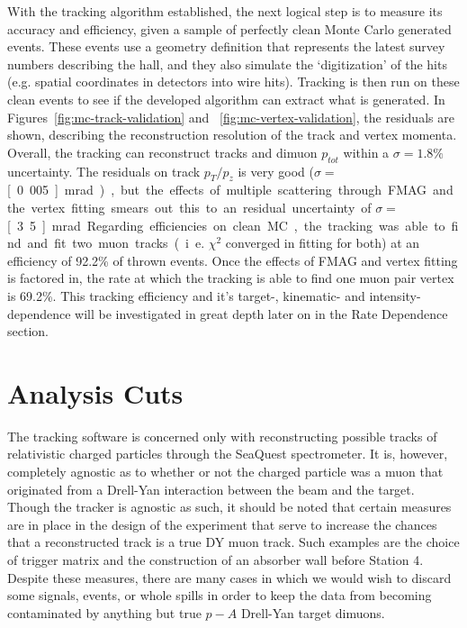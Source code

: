 With the tracking algorithm established, the next logical step is to measure its accuracy and efficiency, given a sample of perfectly clean Monte Carlo generated events. These events use a geometry definition that represents the latest survey numbers describing the hall, and they also simulate the `digitization' of the hits (e.g. spatial coordinates in detectors into wire hits). Tracking is then run on these clean events to see if the developed algorithm can extract what is generated. In Figures~\ref{fig:mc-track-validation} and ~\ref{fig:mc-vertex-validation}, the residuals are shown, describing the reconstruction resolution of the track and vertex momenta. Overall, the tracking can reconstruct tracks and dimuon $p_{tot}$ within a $\sigma=1.8\%$ uncertainty. The residuals on track $p_T/p_z$ is very good ($\sigma=$\unit[0.005]{mrad}), but the effects of multiple scattering through FMAG and the vertex fitting smears out this to an residual uncertainty of $\sigma=$\unit[3.5]{mrad}.

Regarding efficiencies on clean MC, the tracking was able to find and fit two muon tracks (i.e. $\chi^2$ converged in fitting for both) at an efficiency of 92.2\% of thrown events. Once the effects of FMAG and vertex fitting is factored in, the rate at which the tracking is able to find one muon pair vertex is 69.2\%. This tracking efficiency and it's target-, kinematic- and intensity-dependence will be investigated in great depth later on in the Rate Dependence section.

\section{Analysis Cuts}

The tracking software is concerned only with reconstructing possible tracks of relativistic charged particles through the SeaQuest spectrometer. It is, however, completely agnostic as to whether or not the charged particle was a muon that originated from a Drell-Yan interaction between the beam and the target. Though the tracker is agnostic as such, it should be noted that certain measures are in place in the design of the experiment that serve to increase the chances that a reconstructed track is a true DY muon track. Such examples are the choice of trigger matrix and the construction of an absorber wall before Station 4. Despite these measures, there are many cases in which we would wish to discard some signals, events, or whole spills in order to keep the data from becoming contaminated by anything but true $p-A$ Drell-Yan target dimuons.

